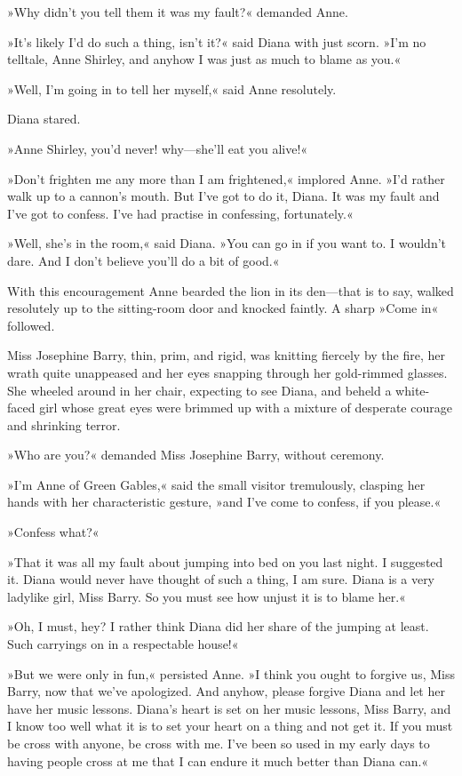 »Why didn’t you tell them it was my fault?« demanded Anne.

»It’s likely I’d do such a thing, isn’t it?« said Diana with just scorn. »I’m no telltale, Anne Shirley, and anyhow I was just as much to blame as you.«

»Well, I’m going in to tell her myself,« said Anne resolutely.

Diana stared.

»Anne Shirley, you’d never! why—she’ll eat you alive!«

»Don’t frighten me any more than I am frightened,« implored Anne. »I’d rather walk up to a cannon’s mouth. But I’ve got to do it, Diana. It was my fault and I’ve got to confess. I’ve had practise in confessing, fortunately.«

»Well, she’s in the room,« said Diana. »You can go in if you want to. I wouldn’t dare. And I don’t believe you’ll do a bit of good.«

With this encouragement Anne bearded the lion in its den—that is to say, walked resolutely up to the sitting-room door and knocked faintly. A sharp »Come in« followed.

Miss Josephine Barry, thin, prim, and rigid, was knitting fiercely by the fire, her wrath quite unappeased and her eyes snapping through her gold-rimmed glasses. She wheeled around in her chair, expecting to see Diana, and beheld a white-faced girl whose great eyes were brimmed up with a mixture of desperate courage and shrinking terror.

»Who are you?« demanded Miss Josephine Barry, without ceremony.

»I’m Anne of Green Gables,« said the small visitor tremulously, clasping her hands with her characteristic gesture, »and I’ve come to confess, if you please.«

»Confess what?«

»That it was all my fault about jumping into bed on you last night. I suggested it. Diana would never have thought of such a thing, I am sure. Diana is a very ladylike girl, Miss Barry. So you must see how unjust it is to blame her.«

»Oh, I must, hey? I rather think Diana did her share of the jumping at least. Such carryings on in a respectable house!«

»But we were only in fun,« persisted Anne. »I think you ought to forgive us, Miss Barry, now that we’ve apologized. And anyhow, please forgive Diana and let her have her music lessons. Diana’s heart is set on her music lessons, Miss Barry, and I know too well what it is to set your heart on a thing and not get it. If you must be cross with anyone, be cross with me. I’ve been so used in my early days to having people cross at me that I can endure it much better than Diana can.«


